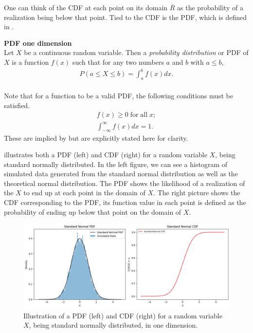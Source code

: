 One can think of the \gls{CDF} at each point on its domain $\bar{R}$ as the probability of a realization being below that point. Tied to the \gls{CDF} is the \gls{PDF}, which is defined in .

\begin{definition}\label{def:PDF1d} \textbf{PDF one dimension} \citet[pp.~160-161]{DevoreBerk2012}\\
    Let $X$ be a continuous random variable. Then a \emph{probability distribution} or \gls{PDF} of $X$ is a function $f(x)$ such that for any two numbers $a$ and $b$ with $a \leq  b$,
        \begin{align*}
            P(a \leq X \leq b) = \int_a^bf(x)dx.\\
        \end{align*}
\end{definition}

\begin{remark}\label{rem:pdfProperties}
    Note that for a function to be a valid \gls{PDF}, the following conditions must be satisfied. 
    \begin{align*}
        f(x) \geq 0 \; \mathrm{ for\; all \;} x;\\
        \int_{-\infty}^{\infty}f(x)dx = 1. 
    \end{align*}
    These are implied by  but are explicitly stated here for clarity. 
\end{remark}


 illustrates both a \gls{PDF} (left) and \gls{CDF} (right) for a random variable $X$, being standard normally distributed. In the left figure, we can see a histogram of simulated data generated from the standard normal distribution as well as the theoretical normal distribution. The \gls{PDF} shows the likelihood of a realization of the $X$ to end up at each point in the domain of $X$. The right picture shows the \gls{CDF} corresponding to the \gls{PDF}, its function value in each point is defined as the probability of ending up below that point on the domain of $X$.

\begin{figure}
    \centering
    \includegraphics[width=1\linewidth]{3Theory/pictures/CDFandPDF1D.png}
    \caption{Illustration of a \gls{PDF} (left) and \gls{CDF} (right) for a random variable $X$, being standard normally distributed, in one dimension.}
    \label{fig:PDFandCDF1D}
\end{figure}

